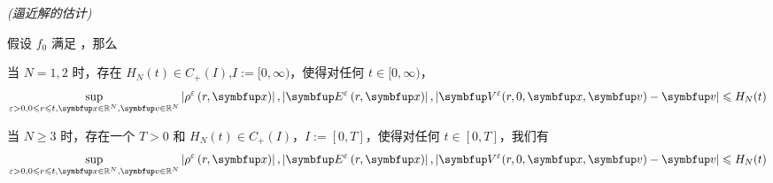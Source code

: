     


\begin{theorem}\textit{(逼近解的估计)}
    \label{thm:some-bound}
    
    假设 $f_{0}$ 满足 \supremumf，那么

    当 $N=1,2$ 时，存在 $H_N(t)\in C_+(I)$,$I:=[0,\infty)$，使得对任何 $t\in [0,\infty)$，
    \begin{equation}
        \sup_{ \varepsilon>0, 0\leqslant r\leqslant t, \vx\in\bbR^N, \vv\in\bbR^N} \left|\rho^{\varepsilon}\left(r, \vx\right)\right| , \left|\vE^{\varepsilon}\left(r, \vx\right)\right|, | \vect{V}^{\varepsilon}(r, 0, \vx, \vv)-\vv |  \leqslant H_N(t)
    \end{equation}
    
    当 $N\geqslant 3$ 时，存在一个 $T>0$ 和 $H_N(t)\in C_+(I)$，$I:=[0,T]$，使得对任何 $t\in [0,T]$，我们有\begin{equation}
        \sup_{\varepsilon>0, 0\leqslant r\leqslant t, \vx\in\bbR^N, \vv\in\bbR^N} \left|\rho^{\varepsilon}\left(r, \vx\right)\right| , \left|\vE^{\varepsilon}\left(r, \vx\right)\right|, | \vect{V}^{\varepsilon}(r, 0, \vx, \vv)-\vv |  \leqslant H_N(t)
    \end{equation}
    
    
\end{theorem}

    
